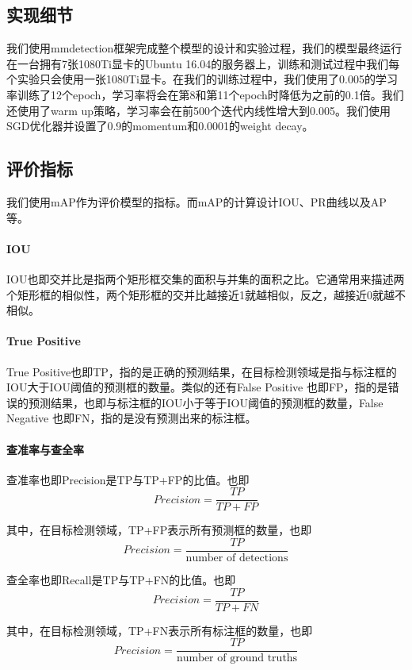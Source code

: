\subsection{实现细节}
\par 我们使用mmdetection\cite{chen2019mmdetection}框架完成整个模型的设计和实验过程，我们的模型最终运行在一台拥有7张1080Ti显卡的Ubuntu 16.04的服务器上，训练和测试过程中我们每个实验只会使用一张1080Ti显卡。在我们的训练过程中，我们使用了0.005的学习率训练了12个epoch，学习率将会在第8和第11个epoch时降低为之前的0.1倍。我们还使用了warm up策略，学习率会在前500个迭代内线性增大到0.005。我们使用SGD优化器并设置了0.9的momentum和0.0001的weight decay。

\subsection{评价指标}
\par 我们使用mAP作为评价模型的指标。而mAP的计算设计IOU、PR曲线以及AP等。

\paragraph{IOU}
\par IOU也即交并比是指两个矩形框交集的面积与并集的面积之比。它通常用来描述两个矩形框的相似性，两个矩形框的交并比越接近1就越相似，反之，越接近0就越不相似。

\paragraph{True Positive}
\par True Positive也即TP，指的是正确的预测结果，在目标检测领域是指与标注框的IOU大于IOU阈值的预测框的数量。类似的还有False Positive 也即FP，指的是错误的预测结果，也即与标注框的IOU小于等于IOU阈值的预测框的数量，False Negative 也即FN，指的是没有预测出来的标注框。

\paragraph{查准率与查全率}
\par 查准率也即Precision是TP与TP+FP的比值。也即
$$Precision=\frac{TP}{TP+FP}$$
\par 其中，在目标检测领域，TP+FP表示所有预测框的数量，也即
$$Precision=\frac{TP}{\text{number of detections}}$$
\par 查全率也即Recall是TP与TP+FN的比值。也即
$$Precision=\frac{TP}{TP+FN}$$
\par 其中，在目标检测领域，TP+FN表示所有标注框的数量，也即
$$Precision=\frac{TP}{\text{number of ground truths}}$$

